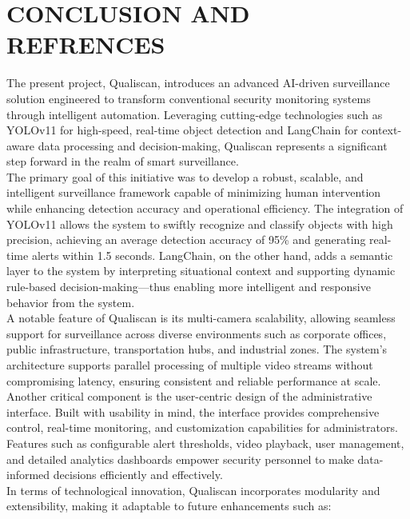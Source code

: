 \documentclass[12pt]{report}
\begin{document}
\chapter{CONCLUSION AND REFRENCES }
{
The present project, Qualiscan, introduces an advanced AI-driven surveillance solution engineered to transform conventional security monitoring systems through intelligent automation. Leveraging cutting-edge technologies such as YOLOv11 for high-speed, real-time object detection and LangChain for context-aware data processing and decision-making, Qualiscan represents a significant step forward in the realm of smart surveillance.\\

The primary goal of this initiative was to develop a robust, scalable, and intelligent surveillance framework capable of minimizing human intervention while enhancing detection accuracy and operational efficiency. The integration of YOLOv11 allows the system to swiftly recognize and classify objects with high precision, achieving an average detection accuracy of 95\% and generating real-time alerts within 1.5 seconds. LangChain, on the other hand, adds a semantic layer to the system by interpreting situational context and supporting dynamic rule-based decision-making—thus enabling more intelligent and responsive behavior from the system.\\

A notable feature of Qualiscan is its multi-camera scalability, allowing seamless support for surveillance across diverse environments such as corporate offices, public infrastructure, transportation hubs, and industrial zones. The system’s architecture supports parallel processing of multiple video streams without compromising latency, ensuring consistent and reliable performance at scale.\\

Another critical component is the user-centric design of the administrative interface. Built with usability in mind, the interface provides comprehensive control, real-time monitoring, and customization capabilities for administrators. Features such as configurable alert thresholds, video playback, user management, and detailed analytics dashboards empower security personnel to make data-informed decisions efficiently and effectively.\\

In terms of technological innovation, Qualiscan incorporates modularity and extensibility, making it adaptable to future enhancements such as:

}
\end{document}
